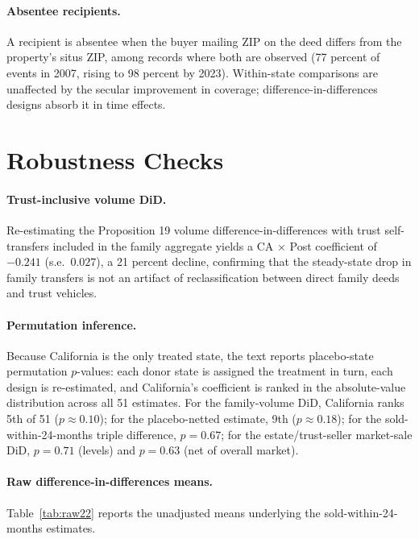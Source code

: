 \paragraph{Absentee recipients.} A recipient is absentee when the buyer
mailing ZIP on the deed differs from the property's situs ZIP, among records
where both are observed (77 percent of events in 2007, rising to 98 percent
by 2023). Within-state comparisons are unaffected by the secular improvement
in coverage; difference-in-differences designs absorb it in time effects.

\section{Robustness Checks}\label{app:robustness}

\paragraph{Trust-inclusive volume DiD.} Re-estimating the Proposition 19
volume difference-in-differences with trust self-transfers included in the
family aggregate yields a CA $\times$ Post coefficient of $-0.241$
(s.e.\ $0.027$), a 21 percent decline, confirming that the steady-state drop
in family transfers is not an artifact of reclassification between direct
family deeds and trust vehicles.

\paragraph{Permutation inference.} Because California is the only treated
state, the text reports placebo-state permutation $p$-values: each donor
state is assigned the treatment in turn, each design is re-estimated, and
California's coefficient is ranked in the absolute-value distribution across
all 51 estimates. For the family-volume DiD, California ranks 5th of 51
($p \approx 0.10$); for the placebo-netted estimate, 9th ($p \approx 0.18$);
for the sold-within-24-months triple difference, $p = 0.67$; for the
estate/trust-seller market-sale DiD, $p = 0.71$ (levels) and $p = 0.63$
(net of overall market).

\paragraph{Raw difference-in-differences means.} Table~\ref{tab:raw22}
reports the unadjusted means underlying the sold-within-24-months estimates.


